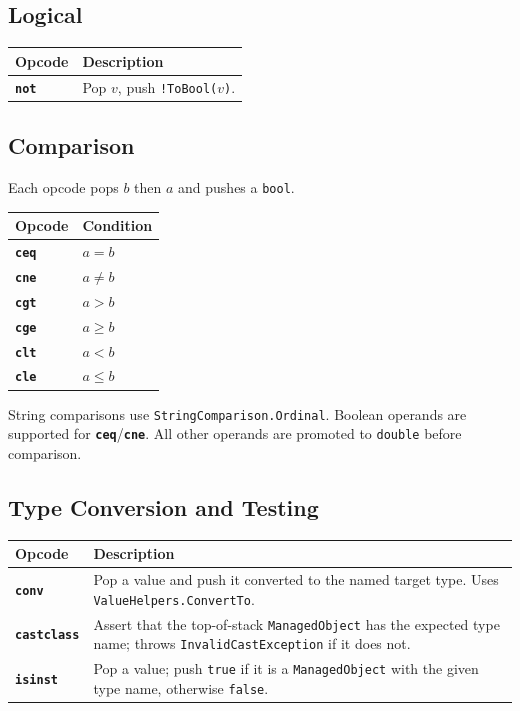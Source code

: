 \documentclass[11pt,a4paper]{article}
\newcommand{\code}[1]{\texttt{\small #1}}
\newcommand{\typename}[1]{\textcolor{typecolor}{\texttt{\small #1}}}
\newcommand{\opcode}[1]{\textbf{\texttt{#1}}}
\begin{document}
\subsection{Logical}

\begin{longtable}{lp{10cm}}
  \toprule
  \textbf{Opcode} & \textbf{Description} \\
  \midrule
  \endhead
  \opcode{not} & Pop $v$, push \texttt{!ToBool($v$)}. \\
  \bottomrule
\end{longtable}

\subsection{Comparison}

Each opcode pops $b$ then $a$ and pushes a \texttt{bool}.

\begin{longtable}{ll}
  \toprule
  \textbf{Opcode} & \textbf{Condition} \\
  \midrule
  \endhead
  \opcode{ceq} & $a = b$ \\
  \opcode{cne} & $a \neq b$ \\
  \opcode{cgt} & $a > b$ \\
  \opcode{cge} & $a \geq b$ \\
  \opcode{clt} & $a < b$ \\
  \opcode{cle} & $a \leq b$ \\
  \bottomrule
\end{longtable}

String comparisons use \code{StringComparison.Ordinal}. Boolean operands
are supported for \opcode{ceq}/\opcode{cne}. All other operands are promoted
to \texttt{double} before comparison.

\subsection{Type Conversion and Testing}

\begin{longtable}{lp{10cm}}
  \toprule
  \textbf{Opcode} & \textbf{Description} \\
  \midrule
  \endhead
  \opcode{conv}      & Pop a value and push it converted to the named target type.
                       Uses \typename{ValueHelpers}\code{.ConvertTo}. \\
  \opcode{castclass} & Assert that the top-of-stack \typename{ManagedObject} has the
                       expected type name; throws \typename{InvalidCastException} if it
                       does not. \\
  \opcode{isinst}    & Pop a value; push \texttt{true} if it is a
                       \typename{ManagedObject} with the given type name, otherwise
                       \texttt{false}. \\
  \bottomrule
\end{longtable}
\end{document}
